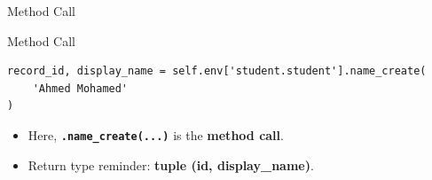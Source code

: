\begin{frame}[fragile]{Method Call}
\begin{block}{Method Call}
\begin{lstlisting}
record_id, display_name = self.env['student.student'].name_create(
	'Ahmed Mohamed'
)
\end{lstlisting}
	\begin{itemize}
		\item Here, \textbf{\texttt{.name\_create(...)}} is the \textbf{method call}.
		\item Return type reminder: \textbf{tuple (id, display\_name)}.
	\end{itemize}
\end{block}
\end{frame}
